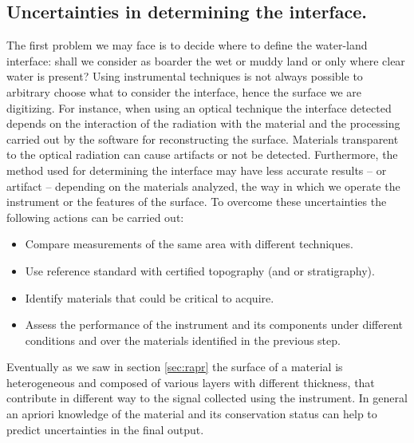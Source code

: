 \subsection{Uncertainties in determining the interface.} 
The first problem we may face is to decide where to define the water-land interface: shall we consider as boarder the wet or muddy land or only where clear water is present? Using instrumental techniques is not always possible to arbitrary choose what to consider the interface, hence the surface we are digitizing. For instance, when using an optical technique the interface detected depends on the interaction of the radiation with the material and the processing carried out by the software for reconstructing the surface. Materials transparent to the optical radiation can cause artifacts or not be detected. Furthermore, the method used for determining the interface may have less accurate results -- or artifact -- depending on the materials analyzed, the way in which we operate the instrument or the features of the surface. To overcome these uncertainties the following actions can be carried out:
\begin{itemize}
    \item Compare measurements of the same area with different techniques.
    \item Use reference standard with certified topography (and or stratigraphy).
    \item Identify materials that could be critical to acquire. 
    \item Assess the performance of the instrument and its components under different conditions and over the materials identified in the previous step.
\end{itemize}
Eventually as we saw in section \ref{sec:rapr} the surface of a material is heterogeneous and composed of various layers with different thickness, that contribute in different way to the signal collected using the instrument. In general an apriori knowledge of the material and its conservation status can help to predict uncertainties in the final output. 


